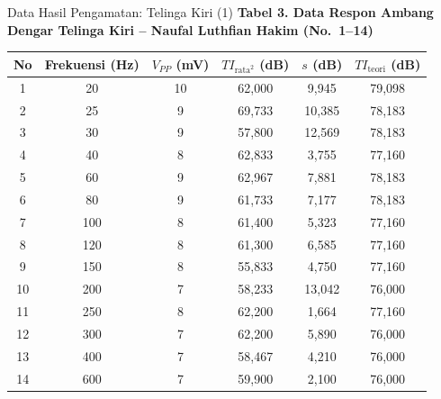 \documentclass[aspectratio=169, 10pt]{beamer}
\begin{document}
	\begin{frame}{Data Hasil Pengamatan: Telinga Kiri (1)}
		\scriptsize
		\textbf{Tabel 3. Data Respon Ambang Dengar Telinga Kiri -- Naufal Luthfian Hakim (No.\ 1--14)}
		\vspace{0.1cm}
		\begin{tabular}{cccccc}
			\toprule
			No & Frekuensi (Hz) & $V_{PP}$ (mV) & $TI_{\text{rata}^2}$ (dB) & $s$ (dB) & $TI_{\text{teori}}$ (dB) \\
			\midrule
			1  & 20     & 10 & 62{,}000 & 9{,}945  & 79{,}098 \\
			2  & 25     & 9  & 69{,}733 & 10{,}385 & 78{,}183 \\
			3  & 30     & 9  & 57{,}800 & 12{,}569 & 78{,}183 \\
			4  & 40     & 8  & 62{,}833 & 3{,}755  & 77{,}160 \\
			5  & 60     & 9  & 62{,}967 & 7{,}881  & 78{,}183 \\
			6  & 80     & 9  & 61{,}733 & 7{,}177  & 78{,}183 \\
			7  & 100    & 8  & 61{,}400 & 5{,}323  & 77{,}160 \\
			8  & 120    & 8  & 61{,}300 & 6{,}585  & 77{,}160 \\
			9  & 150    & 8  & 55{,}833 & 4{,}750  & 77{,}160 \\
			10 & 200    & 7  & 58{,}233 & 13{,}042 & 76{,}000 \\
			11 & 250    & 8  & 62{,}200 & 1{,}664  & 77{,}160 \\
			12 & 300    & 7  & 62{,}200 & 5{,}890  & 76{,}000 \\
			13 & 400    & 7  & 58{,}467 & 4{,}210  & 76{,}000 \\
			14 & 600    & 7  & 59{,}900 & 2{,}100  & 76{,}000 \\
			\bottomrule
		\end{tabular}
	\end{frame}
\end{document}
